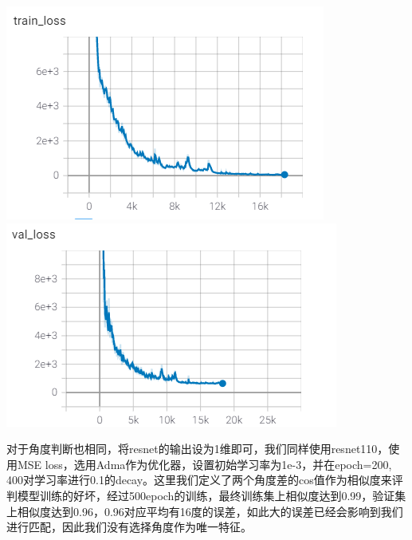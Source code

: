 \documentclass[a4paper]{ctexart}
\begin{document}
\centerline{\includegraphics[scale=0.65]{images/loc_train.png}\includegraphics[scale=0.65]{images/loc_val.png}}

对于角度判断也相同，将resnet的输出设为1维即可，我们同样使用resnet110，使用MSE loss，选用Adma作为优化器，设置初始学习率为1e-3，并在epoch=200, 400对学习率进行0.1的decay。这里我们定义了两个角度差的cos值作为相似度来评判模型训练的好坏，经过500epoch的训练，最终训练集上相似度达到0.99，验证集上相似度达到0.96，0.96对应平均有16度的误差，如此大的误差已经会影响到我们进行匹配，因此我们没有选择角度作为唯一特征。
\end{document}
